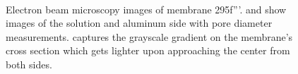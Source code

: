 \documentclass[../thesis.tex]{subfiles}
\begin{document}
            

            \begin{figure}[tpb]
              \centering
              \hfill
              \\
              \caption{Electron beam microscopy images of membrane 295f'''. \protect{} and \protect{} show images of the solution and aluminum side with pore diameter measurements. \protect{} captures the grayscale gradient on the membrane's cross section which gets lighter upon approaching the center from both sides.}
              \label{fig:295f-200ALD-sem}
            \end{figure}
\end{document}
